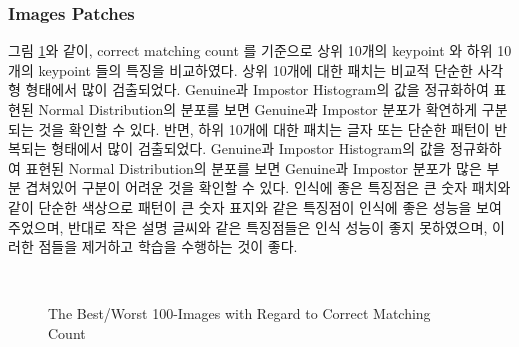 \subsubsection{Images Patches}
그림 \ref{fig:image_patches}와 같이, correct matching count 를 기준으로 상위 10개의 keypoint 와 하위 10개의 keypoint 들의 특징을 비교하였다. 상위 10개에 대한 패치는 비교적 단순한 사각형 형태에서 많이 검출되었다. Genuine과 Impostor Histogram의 값을 정규화하여 표현된 Normal Distribution의 분포를 보면 Genuine과 Impostor 분포가 확연하게 구분되는 것을 확인할 수 있다. 반면, 하위 10개에 대한 패치는 글자 또는 단순한 패턴이 반복되는 형태에서 많이 검출되었다. Genuine과 Impostor Histogram의 값을 정규화하여 표현된 Normal Distribution의 분포를 보면 Genuine과 Impostor 분포가 많은 부분 겹쳐있어 구분이 어려운 것을 확인할 수 있다. 
인식에 좋은 특징점은 큰 숫자 패치와 같이 단순한 색상으로 패턴이 큰 숫자 표지와 같은 특징점이 인식에 좋은 성능을 보여주었으며, 반대로 작은 설명 글씨와 같은 특징점들은 인식 성능이 좋지 못하였으며, 이러한 점들을 제거하고 학습을 수행하는 것이 좋다.


\begin{figure}[htb!]
  \centering     %
\\
  \caption{The Best/Worst 100-Images with Regard to Correct Matching Count}
    \label{fig:image_patches}
\end{figure}


